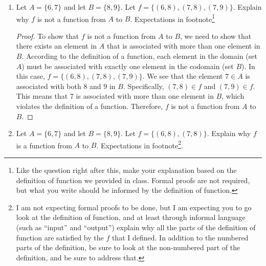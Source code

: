 \documentclass{article}
\begin{document}
\begin{enumerate}
\begin{proof}
    Let $h \in T$ and assume $h$ plays tennis. We need to show that the chancellor calls $h$.
    Since $h \in T$ and $T \subseteq G$ (by H3), we have $h \in G$. By H5, for all $g \in G$ and for all $u \in U$, if $g$ plays tennis and the ice skating performance featured $u$, then the post office delivers a letter from $g$ to $u$. Applying this to $h \in G$, we get that for all $u \in U$, if the ice skating performance featured $u$, then the post office delivers a letter from $h$ to $u$.
    By H6, for all $u \in U$, the ice skating performance featured $u$. Therefore, for all $u \in U$, the post office delivers a letter from $h$ to $u$. This means that $h \in B$ by the definition of $B$.
    Since $h \in B$ and $B \subseteq S$ (by H4), we have $h \in S$. By H1, for all $c \in S$, the chancellor calls $c$. Applying this to $h \in S$, we get that the chancellor calls $h$.
    Therefore, for all $h \in T$, if $h$ plays tennis, then the chancellor calls $h$.
\end{proof}

\newpage

\item Let $A = \{6,7\}$ and let $B=\{8,9\}$. Let $f=\{(6,8),(7,8),(7,9)\}$. Explain why $f$ is not a function from $A$ to $B$. Expectations in footnote\footnote{Like the question right after this, make your explanation based on the definition of function we provided in class. Formal proofs are not required, but what you write should be informed by the definition of function.}

\begin{proof}
    To show that $f$ is not a function from $A$ to $B$, we need to show that there exists an element in $A$ that is associated with more than one element in $B$. According to the definition of a function, each element in the domain (set $A$) must be associated with exactly one element in the codomain (set $B$).
    In this case, $f = \{(6,8),(7,8),(7,9)\}$. We see that the element $7 \in A$ is associated with both $8$ and $9$ in $B$. Specifically, $(7,8) \in f$ and $(7,9) \in f$. This means that $7$ is associated with more than one element in $B$, which violates the definition of a function.
    Therefore, $f$ is not a function from $A$ to $B$.
\end{proof}

\newpage

\item Let $A = \{6,7\}$ and let $B=\{8,9\}$. Let $f=\{(6,8),(7,8)\}$. Explain why $f$ is a function from $A$ to $B$. Expectations in footnote\footnote{I am not expecting formal proofs to be done, but I am expecting you to go look at the definition of function, and at least through informal language (such as ``input'' and ``output'') explain why all the parts of the definition of function are satisfied by the $f$ that I defined. In addition to the numbered parts of the definition, be sure to look at the non-numbered part of the definition, and be sure to address that.}.


\end{enumerate}
\end{document}
